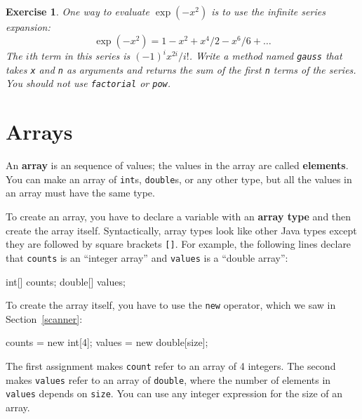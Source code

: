 \documentclass[12pt]{book}
\theoremstyle{exercise}
\newtheorem{exercise}{Exercise}[chapter]
\newcommand{\java}[1]{\verb"#1"}
\begin{document}
\begin{exercise}

One way to evaluate $\exp(-x^2)$ is to use the infinite series expansion:
%
\[ \exp(-x^2) = 1 - x^2 + x^4/2 - x^6/6 + \ldots \]
%
The $i$th term in this series is $(-1)^i x^{2i} / i!$.
Write a method named \java{gauss} that takes \java{x} and \java{n} as arguments and returns the sum of the first \java{n} terms of the series.
You should not use \java{factorial} or \java{pow}.

\end{exercise}


\chapter{Arrays}
\label{arrays}




An {\bf array} is an sequence of values; the values in the array are called {\bf elements}.
You can make an array of \java{int}s, \java{double}s, or any other type, but all the values in an array must have the same type.

To create an array, you have to declare a variable with an {\bf array type} and then create the array itself.
Syntactically, array types look like other Java types except they are followed by square brackets \java{[]}.
For example, the following lines declare that \java{counts} is an ``integer array'' and \java{values} is a ``double array'':

\begin{code}
    int[] counts;
    double[] values;
\end{code}

To create the array itself, you have to use the \java{new} operator, which we saw in Section~\ref{scanner}:

\begin{code}
    counts = new int[4];
    values = new double[size];
\end{code}

The first assignment makes \java{count} refer to an array of 4 integers.
The second makes \java{values} refer to an array of \java{double}, where the number of elements in \java{values} depends on \java{size}.
You can use any integer expression for the size of an array.
\end{document}
